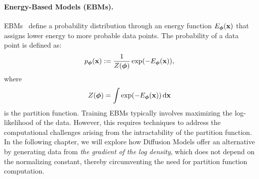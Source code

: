 




\paragraph{Energy-Based Models (EBMs).}
EBMs~\citep{ackley1985learning,lecun2006tutorial} define a probability distribution through an energy function $ E_{\bm{\phi}}({\mathbf{x}}) $ that assigns lower energy to more probable data points. The probability of a data point is defined as:
\begin{equation*}
    p_{\bm{\phi}}({\mathbf{x}}) := \frac{1}{Z({\bm{\phi}})} \exp(-E_{\bm{\phi}}({\mathbf{x}})),
\end{equation*}
where 
\[Z({\bm{\phi}}) = \int \exp(-E_{\bm{\phi}}({\mathbf{x}})) \mathop{}\!\mathrm{d}{\mathbf{x}}\] 
is the partition function. Training EBMs typically involves maximizing the log-likelihood of the data. However, this requires techniques to address the computational challenges arising from the intractability of the partition function. In the following chapter, we will explore how Diffusion Models offer an alternative by generating data from \emph{the gradient of the log density}, which does not depend on the normalizing constant, thereby circumventing the need for partition function computation.




